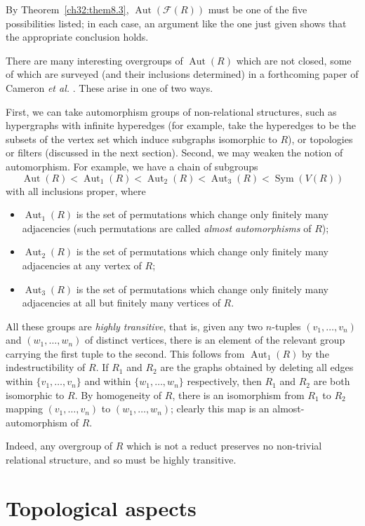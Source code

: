 \documentclass[12pt]{article}
\DeclareMathOperator{\Sym}{Sym}
\DeclareMathOperator{\Aut}{Aut}
\begin{document}
By Theorem~\ref{ch32:them8.3}, $\Aut(\mathcal{F}(R))$ must be
one of the five possibilities listed; in each case, an argument like
the one just given shows that the appropriate conclusion holds.

\medskip

There are many interesting overgroups of $\Aut(R)$ which are not closed,
some of which are surveyed (and their inclusions determined) in a
forthcoming paper of Cameron \emph{et al.} \cite{ch32:new5}. These
arise in one of two ways.

First, we can take automorphism groups of non-relational structures, such as
hypergraphs with infinite hyperedges (for example, take the hyperedges to
be the subsets of the vertex set which induce subgraphs isomorphic to $R$),
or topologies or filters (discussed in the next section). Second, we may
weaken the notion of automorphism. For example, we have a chain of subgroups
\[
\Aut(R)<\Aut_1(R)<\Aut_2(R)<\Aut_3(R)<\Sym(V(R))
\]
with all inclusions proper, where
\begin{itemize}
\item $\Aut_1(R)$ is the set of permutations which change only finitely many
adjacencies (such permutations are called \emph{almost automorphisms} of $R$);
\item $\Aut_2(R)$ is the set of permutations which change only finitely many
adjacencies at any vertex of $R$;
\item $\Aut_3(R)$ is the set of permutations which change only finitely many
adjacencies at all but finitely many vertices of $R$.
\end{itemize}

All these groups are \emph{highly transitive}, that is, given any two
$n$-tuples $(v_1,\ldots,v_n)$ and $(w_1,\ldots,w_n)$ of distinct vertices,
there is an element of the relevant group carrying the first tuple to the
second. This follows from $\Aut_1(R)$ by the indestructibility of $R$. If
$R_1$ and $R_2$ are the graphs obtained by deleting all edges within
$\{v_1,\ldots,v_n\}$ and within $\{w_1,\ldots,w_n\}$ respectively, then
$R_1$ and $R_2$ are both isomorphic to $R$. By homogeneity of $R$, there
is an isomorphism from $R_1$ to $R_2$ mapping $(v_1,\ldots,v_n)$ to
$(w_1,\ldots,w_n)$; clearly this map is an almost-automorphism of $R$.

Indeed, any overgroup of $R$ which is not a reduct preserves no non-trivial
relational structure, and so must be highly transitive.

\section{Topological aspects}%
\label{ch32:sec2.9}
\end{document}
